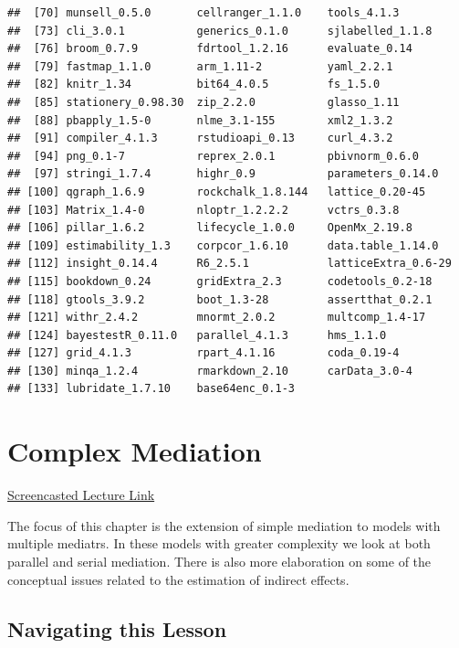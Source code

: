 \documentclass[
]{book}
\begin{document}
\begin{verbatim}
##  [70] munsell_0.5.0       cellranger_1.1.0    tools_4.1.3        
##  [73] cli_3.0.1           generics_0.1.0      sjlabelled_1.1.8   
##  [76] broom_0.7.9         fdrtool_1.2.16      evaluate_0.14      
##  [79] fastmap_1.1.0       arm_1.11-2          yaml_2.2.1         
##  [82] knitr_1.34          bit64_4.0.5         fs_1.5.0           
##  [85] stationery_0.98.30  zip_2.2.0           glasso_1.11        
##  [88] pbapply_1.5-0       nlme_3.1-155        xml2_1.3.2         
##  [91] compiler_4.1.3      rstudioapi_0.13     curl_4.3.2         
##  [94] png_0.1-7           reprex_2.0.1        pbivnorm_0.6.0     
##  [97] stringi_1.7.4       highr_0.9           parameters_0.14.0  
## [100] qgraph_1.6.9        rockchalk_1.8.144   lattice_0.20-45    
## [103] Matrix_1.4-0        nloptr_1.2.2.2      vctrs_0.3.8        
## [106] pillar_1.6.2        lifecycle_1.0.0     OpenMx_2.19.8      
## [109] estimability_1.3    corpcor_1.6.10      data.table_1.14.0  
## [112] insight_0.14.4      R6_2.5.1            latticeExtra_0.6-29
## [115] bookdown_0.24       gridExtra_2.3       codetools_0.2-18   
## [118] gtools_3.9.2        boot_1.3-28         assertthat_0.2.1   
## [121] withr_2.4.2         mnormt_2.0.2        multcomp_1.4-17    
## [124] bayestestR_0.11.0   parallel_4.1.3      hms_1.1.0          
## [127] grid_4.1.3          rpart_4.1.16        coda_0.19-4        
## [130] minqa_1.2.4         rmarkdown_2.10      carData_3.0-4      
## [133] lubridate_1.7.10    base64enc_0.1-3
\end{verbatim}

\hypertarget{CompMed}{%
\chapter{Complex Mediation}\label{CompMed}}

\href{https://spu.hosted.panopto.com/Panopto/Pages/Viewer.aspx?pid=6991fd3d-22b6-44f5-ab5b-ad1000314b7f}{Screencasted Lecture Link}

The focus of this chapter is the extension of simple mediation to models with multiple mediatrs. In these models with greater complexity we look at both parallel and serial mediation. There is also more elaboration on some of the conceptual issues related to the estimation of indirect effects.

\hypertarget{navigating-this-lesson-5}{%
\section{Navigating this Lesson}\label{navigating-this-lesson-5}}
\end{document}
